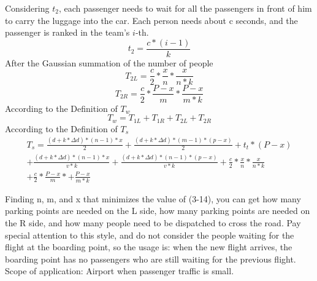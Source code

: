 Considering $t_2$, each passenger needs to wait for all the passengers in front of him to carry the luggage into the car. Each person needs about c seconds, and the passenger is ranked in the team's $i$-th.
\begin{equation} t_{2} = \frac{c*{(i-1)}}{k}\end{equation}
After the Gaussian summation of the number of people
\begin{equation} T_{2L} = \frac{c}{2}*\frac{x}{n}*\frac{x}{n*k}\end{equation}
\begin{equation} T_{2R} = \frac{c}{2}*\frac{P-x}{m}*\frac{P-x}{m*k}\end{equation}
According to the Definition of $T_w$
\begin{equation} T_{w} = T_{1L}+T_{1R}+T_{2L}+T_{2R}\end{equation}
According to the Definition of $T_s$
\begin{equation}\begin{split} T_{s} = \frac{{(d+k*\Delta d)}*{(n-1)}*{x}}{2}+\frac{{(d+k*\Delta d)}*{(m-1)}*{(p-x)}}{2}+t_t*(P-x)\\+\frac{{(d+k*\Delta d)}*{(n-1)}*x}{v*k}+\frac{{(d+k*\Delta d)}*{(n-1)}*(p-x)}{v*k}+\frac{c}{2}*\frac{x}{n}*\frac{x}{n*k}\\+\frac{c}{2}*\frac{P-x}{m}*+\frac{P-x}{m*k}\end{split}\end{equation}

Finding n, m, and x that minimizes the value of (3-14), you can get how many parking points are needed on the L side, how many parking points are needed on the R side, and how many people need to be dispatched to cross the road.
Pay special attention to this style, and do not consider the people waiting for the flight at the boarding point, so the usage is: when the new flight arrives, the boarding point has no passengers who are still waiting for the previous flight.
Scope of application: Airport when passenger traffic is small.\\

